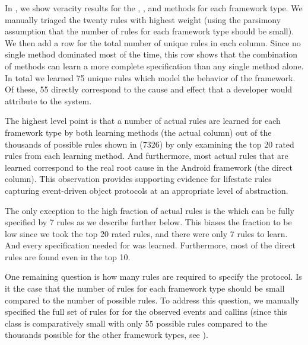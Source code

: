\documentclass[10pt,reprint,nocopyrightspace,numbers]{sigplanconf}
\begin{document}
In , we show veracity results for the , \pfsa, and \hmm methods for each framework type.
We manually triaged the twenty rules with highest weight (using the parsimony assumption that the number of rules for each framework type should be small). We then add a row for the total number of unique rules in each column.  Since no single method dominated most of the time, this row shows that the combination of methods can learn a more complete specification than any single method alone.  In total we learned 75 unique rules which model the behavior of the framework. Of these, 55 directly correspond to the cause and effect that a developer would attribute to the system.

The highest level point is that a number of actual rules are learned for each framework type by both learning methods (the actual column) out of the thousands of possible rules shown in  (7326) by only examining the top 20 rated rules from each learning method.
%
And furthermore, most actual rules that are learned correspond to the real root cause in the Android framework (the direct column). This observation provides supporting evidence for lifestate rules capturing event-driven object protocols at an appropriate level of abstraction.

The only exception to the high fraction of actual rules is the \AsyncTaskBench{} which can be fully specified by 7 rules as we describe further below. This biases the fraction to be low since we took the top 20 rated rules, and there were only 7 rules to learn. And every specification needed for \AsyncTaskBench{} was learned. Furthermore, most of the direct rules are found even in the top 10.

\newsavebox{\SBoxAsyncTaskonPostExecuteCi}

One remaining question is how many rules are required to specify the protocol.
Is it the case that the number of rules for each framework type should be small compared to the number of possible rules.
To address this question, we manually specified the full set of rules for \AsyncTaskBench{} for the observed events and callins (since this class is comparatively small with only 55 possible rules compared to the thousands possible for the other framework types, see ).
\end{document}
